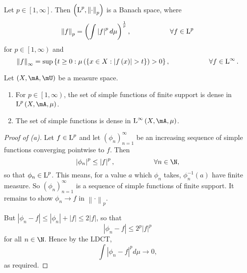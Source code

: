 \documentclass[pmath451]{subfiles}
\begin{document}
    \rruleline

    \begin{prop}{}
        Let $p\in\left[ 1,\infty \right]$. Then $\left( \operatorname{L}^p,\left\lVert \cdot\right\rVert_p \right)$ is a Banach space, where
        \begin{equation*}
            \left\lVert f\right\rVert_p = \left( \int \left| f \right|^pd\mu \right)^{\frac{1}{p}}, \hspace{2cm}\forall f\in\operatorname{L}^p
        \end{equation*}
        for $p\in\left[ 1,\infty \right)$ and
        \begin{equation*}
            \left\lVert f \right\rVert_{\infty} = \sup\left\lbrace t\geq 0 : \mu\left( \left\lbrace x\in X: \left| f\left( x \right) \right|>t \right\rbrace \right) > 0 \right\rbrace, \hspace{2cm}\forall f\in\LLL^{\infty}.
        \end{equation*}
    \end{prop}

    \rruleline
    
    \begin{prop}{}
        Let $\left( X,\mA,\mU \right)$ be a measure space.
        \begin{enumerate}
            \item For $p\in\left[ 1,\infty \right)$, the set of simple functions of finite support is dense in $\LLL^p\left( X,\mA,\mu \right)$.
            \item The set of simple functions is dense in $\LLL^{\infty}\left( X,\mA,\mu \right)$.
        \end{enumerate}
    \end{prop}

    \begin{proof}[Proof of (a)]\qedplacedtrue
        Let $f\in\operatorname{L}^p$ and let $\left( \phi_{n} \right)^{\infty}_{n=1}$ be an increasing sequence of simple functions converging pointwise to $f$. Then
        \begin{equation*}
            \left| \phi_n \right|^p\leq\left| f \right|^p, \hspace{2cm}\forall n\in\N,
        \end{equation*}
        so that $\phi_n\in\operatorname{L}^p$. This means, for a value $a$ which $\phi_n$ takes, $\phi_n^{-1}\left( a \right)$ have finite measure. So $\left( \phi_{n} \right)^{\infty}_{n=1}$ is a sequence of simple functions of finite support. It remains to show $\phi_n\to f$ in $\left\lVert \cdot\right\rVert_p$.

        But $\left| \phi_n-f \right|\leq\left| \phi_n \right|+\left| f \right|\leq 2\left| f \right|$, so that
        \begin{equation*}
            \left| \phi_n-f \right| \leq 2^p\left| f \right|^p
        \end{equation*}
        for all $n\in\N$. Hence by the LDCT,
        \begin{equation*}
            \int\left| \phi_n-f \right|^pd\mu \to 0,
        \end{equation*}
        as required.
    \end{proof}
\end{document}
